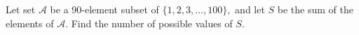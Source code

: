 Let set $\mathcal{A}$ be a 90-element subset of $\{1,2,3,\ldots,100\},$ and let $S$ be the sum of the elements of $\mathcal{A}$.  Find the number of possible values of $S$.